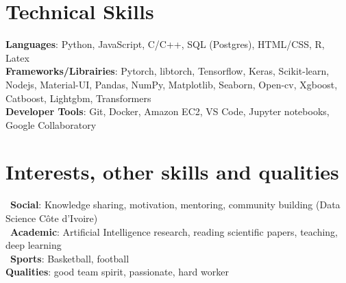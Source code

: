 \documentclass[letterpaper,11pt]{article}
\begin{document}
\section{\textbf{Technical Skills} \faLinux \ \faWindows \ \faApple\ \faLanguage \ \faServer}
 \begin{itemize}[leftmargin=0.15in, label={}]
    \small{\item{
        \textbf{Languages}{: Python, JavaScript, C/C++, SQL (Postgres), HTML/CSS, R, Latex} \\
        \textbf{Frameworks/Librairies}{: Pytorch, libtorch, Tensorflow, Keras, Scikit-learn, Nodejs, Material-UI, Pandas, NumPy, Matplotlib, Seaborn, Open-cv, Xgboost, Catboost, Lightgbm, Transformers} \\
        \textbf{Developer Tools}{: Git, Docker, Amazon EC2, VS Code, Jupyter notebooks, Google Collaboratory} \\
    }}
 \end{itemize}

%
\section{\textbf{Interests, other skills and qualities} \faStar}
\begin{itemize}[leftmargin=0.15in, label={}]
    \small{\item{
        \faGroup \ \textbf{Social}{: Knowledge sharing, motivation, mentoring, community building (Data Science Côte d'Ivoire)} \\
        \faBook \ \textbf{Academic}{: Artificial Intelligence research, reading scientific papers, teaching, deep learning} \\
        \faSoccerBallO \ \textbf{Sports}{: Basketball, football} \\
        \textbf{Qualities}{: good team spirit, passionate, hard worker} \\

    }}
 \end{itemize}


\end{document}

